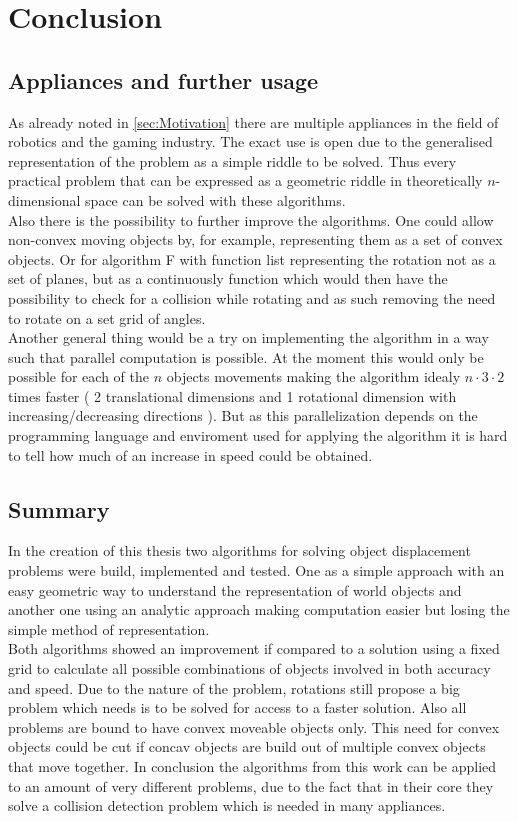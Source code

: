 \chapter{Conclusion}
\section{Appliances and further usage}
As already noted in \ref{sec:Motivation} there are multiple appliances in the field of robotics and the gaming industry. The exact use is open due to the generalised representation of the problem as a simple riddle to be solved. Thus every practical problem that can be expressed as a geometric riddle in theoretically $n$-dimensional space can be solved with these algorithms.\\
Also there is the possibility to further improve the algorithms. One could allow non-convex moving objects by, for example, representing them as a set of convex objects. Or for algorithm F with function list representing the rotation not as a set of planes, but as a continuously function which would then have the possibility to check for a collision while rotating and as such removing the need to rotate on a set grid of angles.\\
Another general thing would be a try on implementing the algorithm in a way such that parallel computation is possible. At the moment this would only be possible for each of the $n$ objects movements making the algorithm idealy $n\cdot3\cdot2$ times faster ( 2 translational dimensions and 1 rotational dimension with increasing/decreasing directions ). But as this parallelization depends on the programming language and enviroment used for applying the algorithm it is hard to tell how much of an increase in speed could be obtained.
\section{Summary}
In the creation of this thesis two algorithms for solving object displacement problems were build, implemented and tested. One as a simple approach with an easy geometric way to understand the representation of world objects and another one using an analytic approach making computation easier but losing the simple method of representation. \\
Both algorithms showed an improvement if compared to a solution using a fixed grid to calculate all possible combinations of objects involved in both accuracy and speed. Due to the nature of the problem, rotations still propose a big problem which needs is to be solved for access to a faster solution. Also all problems are bound to have convex moveable objects only. This need for convex objects could be cut if concav objects are build out of multiple convex objects that move together. 
In conclusion the algorithms from this work can be applied to an amount of very different problems, due to the fact that in their core they solve a collision detection problem which is needed in many appliances.   